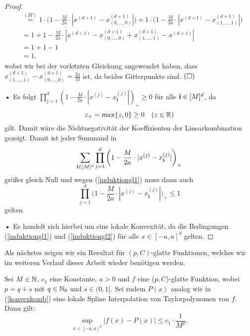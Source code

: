 \begin{proof}
\begin{equation*}
\begin{split}
& \stackrel{(IV)}{=} 1 \cdot \bigg(1 - \frac{M}{2a} \cdot |x^{(d + 1)} - x_{(0,\dots,0)}^{(d + 1)}|\bigg) + 1 \cdot \bigg(1 - \frac{M}{2a} \cdot |x^{(d + 1)} - x_{(1,\dots,1)}^{(d + 1)}|\bigg) \\
& = 1 + 1 - \frac{M}{2a} \cdot |x^{(d + 1)} - x_{(0,\dots,0)}^{(d + 1)} + x_{(1,\dots,1)}^{(d + 1)} - x^{(d + 1)}| \\
& = 1 + 1 - 1 \\
& = 1,
\end{split}
\end{equation*}
wobei wir bei der vorletzten Gleichung angewendet haben, dass $x_{(1,\dots,1)}^{(d + 1)} - x_{(0,\dots,0)}^{(d + 1)} = \frac{2a}{M}$ ist, da beides Gitterpunkte sind.  $\hfill(\square)$ 		
		
\textbf{•} Es folgt $\prod_{j = 1}^d (1 - \frac{M}{2a} \cdot |x^{(j)} - x_{\mathbf{i}}^{(j)}|)_+ \geq 0$ für alle $\mathbf{i} \in [M]^d$, da $$z_+= \max\{z, 0\} \geq 0 \quad (z \in \mathbb{R})$$ gilt. Damit wäre die Nichtnegativität der Koeffizienten der Linearkombination gezeigt. Damit ist jeder Summand in $$\sum_{\mathbf{i} \in [M]^d} \prod_{j = 1}^d \bigg(1 - \frac{M}{2a} \cdot |x^{(j)} - x_{\mathbf{i}}^{(j)}|\bigg)_+$$ größer gleich Null und wegen (\ref{induktiongl1}) muss dann auch 
\begin{equation}
\label{induktiongl2}
\prod_{j = 1}^d \bigg(1 - \frac{M}{2a} \cdot |x^{(j)} - x_{\mathbf{i}}^{(j)}|\bigg)_+ \leq 1
\end{equation}
gelten.

\textbf{•} Es handelt sich hierbei um eine lokale Konvexität, da die Bedingungen (\ref{induktiongl1}) und (\ref{induktiongl2}) für alle $x \in [-a, a]^d$ gelten.
\end{proof}
Als nächstes zeigen wir ein Resultat für $(p, C)$-glatte Funktionen, welches wir im weiteren Verlauf dieser Arbeit wieder benötigen werden.
\begin{lem}
\label{lem:pcsmooth}
Sei $M \in \mathbb{N}$, $c_1$ eine Konstante, $a > 0$ und $f$ eine ($p, C$)-glatte Funktion, wobei $p = q + s$ mit $q \in \mathbb{N}_0$ und $s \in (0,1]$. Sei zudem $P(x)$ analog wie in (\ref{konvexkomb}) eine lokale Spline Interpolation von Taylorpolynomen von $f$. Dann gilt$\colon$
$$\sup_{x \in [-a, a]^d} |f(x) - P(x)|  \leq c_1 \cdot \frac{1}{M^p}.$$
\end{lem}

